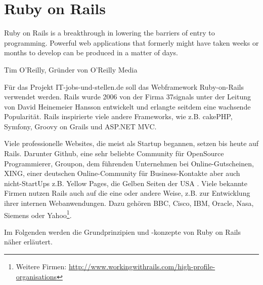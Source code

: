 
\section{Ruby on Rails}
\label{sec:rails}
\epigraph{Ruby on Rails is a breakthrough in lowering the barriers of entry to programming. Powerful web applications that formerly might have taken weeks or months to develop can be produced in a matter of days.}{Tim O'Reilly, Gründer von O'Reilly Media}


Für das Projekt IT-jobs-und-stellen.de soll das Webframework Ruby-on-Rails verwendet werden. Rails wurde 2006 von der Firma 37signals unter der Leitung von David Heinemeier Hansson entwickelt und erlangte seitdem eine wachsende Popularität. Rails inspirierte viele andere Frameworks, wie z.B. cakePHP, Symfony, Groovy on Grails und ASP.NET MVC.

Viele professionelle Websites, die meist als Startup begannen, setzen bis heute auf Rails. Darunter Github, eine sehr beliebte Community für OpenSource Programmierer,  Groupon, dem führenden Unternehmen bei Online-Gutscheinen, XING, einer deutschen Online-Community für Business-Kontakte aber auch nicht-StartUps z.B. Yellow Pages, die Gelben Seiten der USA \citep{ruby_on_rails_2011}. Viele bekannte Firmen nutzen Rails auch auf die eine oder andere Weise, z.B. zur Entwicklung ihrer internen Webanwendungen. Dazu gehören BBC, Cisco, IBM, Oracle, Nasa, Siemens oder Yahoo\footnote{Weitere Firmen: \url{http://www.workingwithrails.com/high-profile-organisations}}.

Im Folgenden werden die Grundprinzipien und -konzepte von Ruby on Rails näher erläutert.

